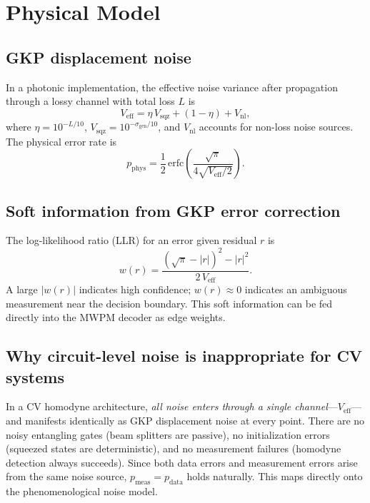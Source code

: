 \documentclass[twocolumn,showpacs,preprintnumbers,amsmath,amssymb,superscriptaddress]{revtex4-2}
\begin{document}
\section{Physical Model}
\label{sec:model}

\subsection{GKP displacement noise}

In a photonic implementation, the effective noise variance after propagation through a lossy channel with total loss $L$ is
\begin{equation}
V_{\mathrm{eff}} = \eta \, V_{\mathrm{sqz}} + (1 - \eta) + V_{\mathrm{nl}},
\label{eq:veff}
\end{equation}
where $\eta = 10^{-L/10}$, $V_{\mathrm{sqz}} = 10^{-\sigma_{\mathrm{gen}}/10}$, and $V_{\mathrm{nl}}$ accounts for non-loss noise sources. The physical error rate is
\begin{equation}
p_{\mathrm{phys}} = \frac{1}{2}\,\mathrm{erfc}\!\left(\frac{\sqrt{\pi}}{4\sqrt{V_{\mathrm{eff}}/2}}\right).
\label{eq:pphys}
\end{equation}

\subsection{Soft information from GKP error correction}

The log-likelihood ratio (LLR) for an error given residual $r$ is~\cite{noh2022}
\begin{equation}
w(r) = \frac{(\sqrt{\pi} - |r|)^2 - |r|^2}{2\,V_{\mathrm{eff}}}.
\label{eq:llr}
\end{equation}
A large $|w(r)|$ indicates high confidence; $w(r) \approx 0$ indicates an ambiguous measurement near the decision boundary. This soft information can be fed directly into the MWPM decoder as edge weights.

\subsection{Why circuit-level noise is inappropriate for CV systems}

In a CV homodyne architecture, \emph{all noise enters through a single channel}---$V_{\mathrm{eff}}$---and manifests identically as GKP displacement noise at every point. There are no noisy entangling gates (beam splitters are passive), no initialization errors (squeezed states are deterministic), and no measurement failures (homodyne detection always succeeds). Since both data errors and measurement errors arise from the same noise source, $p_{\mathrm{meas}} = p_{\mathrm{data}}$ holds naturally. This maps directly onto the phenomenological noise model.
\end{document}

